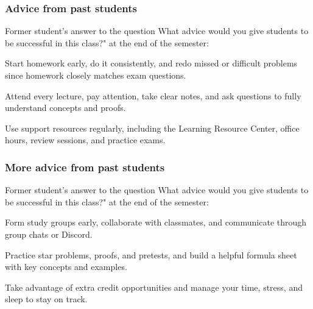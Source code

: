 \documentclass{beamer}
\newenvironment{packed_enum}{
\begin{enumerate}
  \setlength{\itemsep}{1pt}
  \setlength{\parskip}{0pt}
  \setlength{\parsep}{0pt}
}{\end{enumerate}}
\begin{document}



\frame
{
  \frametitle{Advice from past students}

Former student's answer to the question What advice would you give students to be successful in this class?" at the end of the semester:\vfill

\begin{packed_enum}
\item Start homework early, do it consistently, and redo missed or difficult problems since homework closely matches exam questions.
\item Attend every lecture, pay attention, take clear notes, and ask questions to fully understand concepts and proofs.
\item Use support resources regularly, including the Learning Resource Center, office hours, review sessions, and practice exams.

\end{packed_enum}
\vfill
}


\frame
{
  \frametitle{More advice from past students}

Former student's answer to the question What advice would you give students to be successful in this class?" at the end of the semester: \vfill

\begin{packed_enum}

\item Form study groups early, collaborate with classmates, and communicate through group chats or Discord.
\item Practice star problems, proofs, and pretests, and build a helpful formula sheet with key concepts and examples.
\item Take advantage of extra credit opportunities and manage your time, stress, and sleep to stay on track.
\end{packed_enum}
}
\vfill
\end{document}
